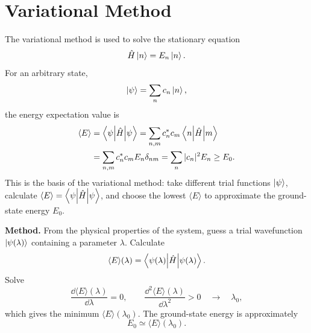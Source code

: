 \section{Variational Method}
The variational method is used to solve the stationary equation
\begin{equation}
 \hat{H}\left|n\right\rangle=E_n\left|n\right\rangle.
\end{equation}
For an arbitrary state,
\begin{equation}
 \left|\psi\right\rangle=\sum_n c_n\left|n\right\rangle,
\end{equation}
the energy expectation value is
\begin{equation}\begin{aligned}
 \langle E\rangle&=\left\langle\psi\middle|\hat{H}\middle|\psi\right\rangle
 =\sum_{n,m}c_n^*c_m\left\langle n\middle|\hat{H}\middle|m\right\rangle\\
 &=\sum_{n,m}c_n^*c_m E_n\delta_{nm}
 =\sum_n|c_n|^2E_n\ge E_0.
\end{aligned}\end{equation}
This is the basis of the variational method: take different trial functions $\left|\psi\right\rangle$, calculate $\langle E\rangle=\left\langle\psi\middle|\hat{H}\middle|\psi\right\rangle$, and choose the lowest $\langle E\rangle$ to approximate the ground-state energy $E_0$.

\textbf{Method.} From the physical properties of the system, guess a trial wavefunction $\left|\psi(\lambda)\right\rangle$ containing a parameter $\lambda$. Calculate
\begin{equation}
 \langle E\rangle(\lambda)=\left\langle\psi(\lambda)\middle|\hat{H}\middle|\psi(\lambda)\right\rangle.
\end{equation}
Solve
\begin{equation}
 \frac{\dd\langle E\rangle(\lambda)}{\dd\lambda}=0,
 \qquad \frac{\dd^2\langle E\rangle(\lambda)}{\dd\lambda^2}>0
 \quad\longrightarrow\quad\lambda_0,
\end{equation}
which gives the minimum $\langle E\rangle(\lambda_0)$. The ground-state energy is approximately
\begin{equation}
 E_0\simeq\langle E\rangle(\lambda_0).
\end{equation}

